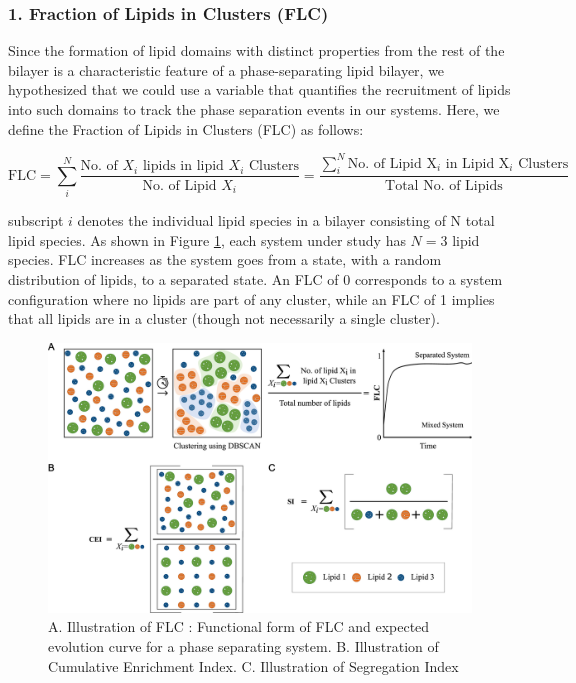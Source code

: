 \documentclass{biophys-new}
\providecommand{\DIFaddtex}[1]{{\protect\color{blue}\uwave{#1}}} %
\providecommand{\DIFaddbegin}{} %
\providecommand{\DIFaddend}{} %
\providecommand{\DIFadd}[1]{\texorpdfstring{\DIFaddtex{#1}}{#1}} %
\newcommand{\DIFaddincludegraphics}[2][]{{\color{blue}\fbox{\DIFOincludegraphics[#1]{#2}}}} %
\DeclareRobustCommand{\DIFaddbegin}{\DIFOaddbegin \let\includegraphics\DIFaddincludegraphics} %
\DeclareRobustCommand{\DIFaddend}{\DIFOaddend \let\includegraphics\DIFOincludegraphics} %
\begin{document}
\subsubsection*{1. Fraction of Lipids in Clusters (FLC)}
Since the formation of lipid domains with distinct properties from the rest of the bilayer is a characteristic feature of a phase-separating lipid bilayer,
we hypothesized that we could use a variable that quantifies the recruitment of lipids into such domains to track the phase separation events in our systems.
Here, we define the Fraction of Lipids in Clusters (FLC) as follows:

\begin{equation}
    \label{eq:FLC}
    \text{FLC} = \sum_{i}^{N} \frac{\text{No. of $X_i$ lipids in lipid $X_i$ Clusters}}{\text{No. of Lipid $X_i$}} =  \frac{\sum_{i}^{N} \text{No. of Lipid X$_i$ in Lipid X$_i$ Clusters}}{\text{Total No. of Lipids}}
\end{equation}

\noindent  \DIFaddbegin \DIFadd{where }\DIFaddend subscript $i$ denotes the individual lipid species in a bilayer consisting of N total lipid species.
As shown in Figure \ref{fig2:view}, each system under study has $N=3$ lipid species.
FLC increases as the system goes from a  \DIFaddbegin \DIFadd{well-mixed }\DIFaddend state, with a random distribution of lipids, to a separated state.
An FLC of 0 corresponds to a system configuration where no lipids are part of any cluster,
while an FLC of 1 implies that all lipids are in a cluster (though not necessarily a single cluster).


\begin{figure}[hbt!]
    \centering
    \includegraphics[width=6.5in]{Figures/Main/2/placeholder.jpg}
    \caption{A. Illustration of FLC :  Functional form of FLC and expected evolution curve for a phase separating system. B. Illustration of Cumulative Enrichment Index. C. Illustration of Segregation Index}
    \label{fig2:view}
\end{figure}
\end{document}
